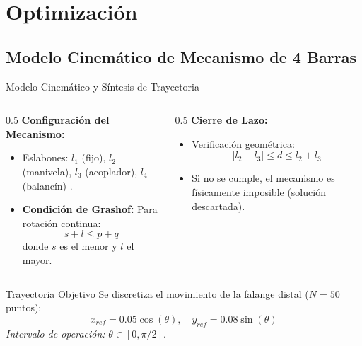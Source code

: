 \documentclass[xcolor={table,dvipsnames}]{beamer}
\begin{document}
\section{Optimizaci\'on}

\subsection{Modelo Cinem\'atico de Mecanismo de 4 Barras}
\begin{frame}{Modelo Cinem\'atico y S\'intesis de Trayectoria}
    \begin{columns}[T]
        \begin{column}{0.5\textwidth}
            \textbf{Configuraci\'on del Mecanismo:}
            \begin{itemize}
                \item Eslabones: $l_1$ (fijo), $l_2$ (manivela), $l_3$ (acoplador), $l_4$ (balanc\'in) \cite{Norton2012}.
                \item \textbf{Condici\'on de Grashof:} Para rotaci\'on continua:
                \[ s + l \leq p + q \]
                donde $s$ es el menor y $l$ el mayor.
            \end{itemize}
        \end{column}

        \begin{column}{0.5\textwidth}
            \textbf{Cierre de Lazo:}
            \begin{itemize}
                \item Verificaci\'on geom\'etrica:
                \[ |l_2 - l_3| \leq d \leq l_2 + l_3 \]
                \item Si no se cumple, el mecanismo es f\'isicamente imposible (soluci\'on descartada).
            \end{itemize}
        \end{column}
    \end{columns}

    \tiny
    \begin{block}{Trayectoria Objetivo}
        Se discretiza el movimiento de la falange distal ($N=50$ puntos):
        \[ x_{ref} = 0.05 \cos(\theta), \quad y_{ref} = 0.08 \sin(\theta) \]
        \textit{Intervalo de operaci\'on:} $\theta \in [0, \pi/2]$.
    \end{block}
\end{frame}
\end{document}
